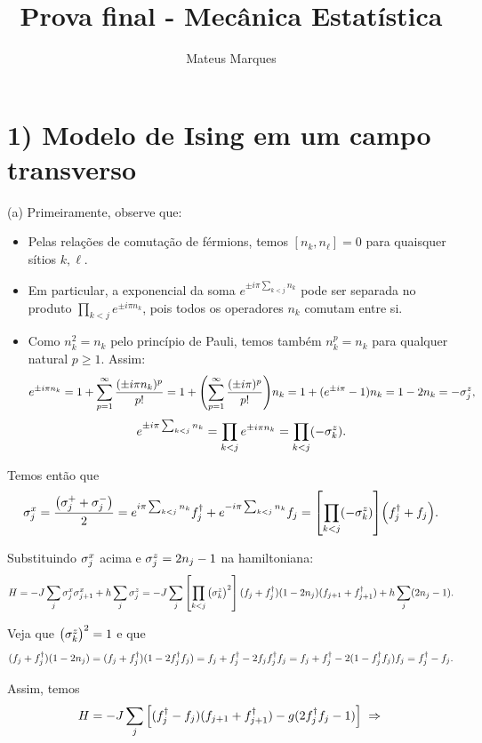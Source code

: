 \documentclass[a4paper,10pt]{article}
\title{\Huge{\textbf{Prova final - Mecânica Estatística}}}
\author{Mateus Marques}
\begin{document}
\maketitle

\section*{1) Modelo de Ising em um campo transverso}

(a) Primeiramente, observe que:
\begin{itemize}
\item Pelas relações de comutação de férmions, temos $[n_k, n_\ell] = 0$ para quaisquer sítios $k, \ell$.

\n

\item Em particular, a exponencial da soma $e^{\pm i\pi \sum_{k<j} n_k}$ pode ser separada no produto $\prod_{k<j} e^{\pm i\pi n_k}$, pois todos os operadores $n_k$ comutam entre si.

\n

\item Como $n_k^2 = n_k$ pelo princípio de Pauli, temos também $n_k^p = n_k$ para qualquer natural $p\geq 1$. Assim:
$$
e^{\pm i\pi n_k} = 1 + \sum_{p=1}^{\infty} \frac{(\pm i\pi n_k)^p}{p!} = 1+ \qty( \sum_{p=1}^{\infty} \frac{(\pm i\pi)^p}{p!} ) n_k = 1 + (e^{\pm i \pi} - 1) n_k = 1 - 2 n_k = - \sigma_j^z,
$$
$$
e^{\pm i\pi \sum_{k<j} n_k} = \prod_{k<j} e^{\pm i\pi n_k} = \prod_{k<j} (-\sigma_k^z).
$$

\end{itemize}

Temos então que
$$
\sigma_j^x = \frac{\qty(\sigma_j^+ + \sigma_j^-)}{2} =
e^{i\pi \sum_{k<j} n_k} f_j^\dagger + e^{-i\pi \sum_{k<j} n_k} f_j =
\qty[\prod_{k<j} (-\sigma_k^z)] \qty(f_j^\dagger + f_j).
$$

\n

Substituindo $\sigma_j^x$ acima e $\sigma_j^z = 2 n_j - 1$ na hamiltoniana:
$$
H = -J \sum_{j} \sigma_j^x \sigma_{j+1}^x + h \sum_{j} \sigma_j^z =
-J \sum_{j} \qty[\prod_{k<j} \big(\sigma_k^z\big)^2] (f_j+f_j^\dagger)(1-2n_j)(f_{j+1} + f_{j+1}^\dagger) + h \sum_{j} (2n_j - 1).
$$

Veja que $\big(\sigma_k^z\big)^2 = 1$ e que
$$
(f_j+f_j^\dagger)(1-2n_j) = (f_j+f_j^\dagger)(1-2 f_j^\dagger f_j) =
f_j+f_j^\dagger - 2 f_j f_j^\dagger f_j =
f_j+f_j^\dagger - 2 (1 - f_j^\dagger f_j) f_j =
f_j^\dagger - f_j.
$$

\n

Assim, temos
$$
H =
-J \sum_{j} \qty[ (f_j^\dagger - f_j) (f_{j+1} + f_{j+1}^\dagger) - g (2 f_j^\dagger f_j - 1)] \; \Rightarrow \;
$$
\end{document}
